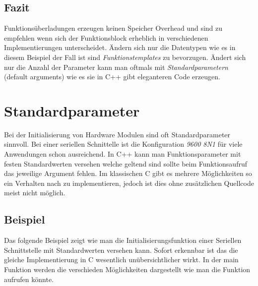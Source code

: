 \documentclass[MES,Master,ngerman]{twbook}%
\begin{document}
\subsection{Fazit}
Funktionsüberladungen erzeugen keinen Speicher Overhead und sind zu empfehlen wenn sich der Funktionsblock erheblich in verschiedenen Implementierungen unterscheidet. Ändern sich nur die Datentypen wie es in diesem Beispiel der Fall ist sind \textit{Funktionstemplates} zu bevorzugen. Ändert sich nur die Anzahl der Parameter kann man oftmals mit \textit{Standardparametern} (default arguments) wie es sie in C++ gibt eleganteren Code erzeugen.

\newpage
\section{Standardparameter}
Bei der Initialisierung von Hardware Modulen sind oft Standardparameter sinnvoll. Bei einer seriellen Schnittelle ist die Konfiguration \textit{9600 8N1} für viele Anwendungen schon ausreichend. In C++ kann man Funktionsparameter mit festen Standardwerten versehen welche geltend sind sollte beim Funktionsaufruf das jeweilige Argument fehlen. Im klassischen C gibt es mehrere Möglichkeiten so ein Verhalten nach zu implementieren, jedoch ist dies ohne zusätzlichen Quellcode meist nicht möglich.

\subsection{Beispiel}          
Das folgende Beispiel zeigt wie man die Initialisierungsfunktion einer Seriellen Schnittstelle mit Standardwerten versehen kann. Sofort erkennbar ist das die gleiche Implementierung in C wesentlich unübersichtlicher wirkt. In der main Funktion werden die verschieden Möglichkeiten dargestellt wie man die Funktion aufrufen könnte.
\begin{figure}[!htb]
	\begin{subfigure}[b]{0.5\textwidth}
		
		\label{fig:3}
	\end{subfigure}
	\begin{subfigure}[b]{0.5\textwidth}
		
		\label{fig:4}
	\end{subfigure}
\end{figure}
\end{document}
